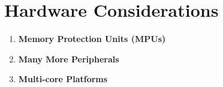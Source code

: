 \section{Hardware Considerations}

\begin{enumerate}
\item \bf{Memory Protection Units (MPUs)}

\item \bf{Many More Peripherals}

\item \bf{Multi-core Platforms}
\end{enumerate}
